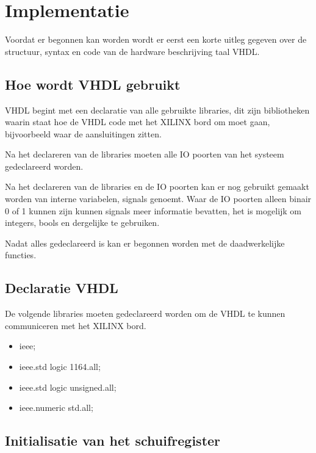 \chapter{Implementatie}

Voordat er begonnen kan worden wordt er eerst een korte uitleg gegeven over de structuur, syntax en code van de hardware beschrijving taal VHDL.

\section{Hoe wordt VHDL gebruikt}

VHDL begint met een declaratie van alle gebruikte libraries, dit zijn bibliotheken waarin staat hoe de VHDL code met het XILINX bord om moet gaan, bijvoorbeeld waar de aansluitingen zitten.

Na het declareren van de libraries moeten alle IO poorten van het systeem gedeclareerd worden.

Na het declareren van de libraries en de IO poorten kan er nog gebruikt gemaakt worden van interne variabelen, signals genoemt. Waar de IO poorten alleen binair 0 of 1 kunnen zijn kunnen signals meer informatie bevatten, het is mogelijk om integers, bools en dergelijke te gebruiken.

Nadat alles gedeclareerd is kan er begonnen worden met de daadwerkelijke functies.

\clearpage
\section{Declaratie VHDL}

De volgende libraries moeten gedeclareerd worden om de VHDL te kunnen communiceren met het XILINX bord.

\begin{itemize}
	\item ieee;
	\item ieee.std logic 1164.all;
	\item ieee.std logic unsigned.all;
	\item ieee.numeric std.all;
\end{itemize}
\section{Initialisatie van het schuifregister}

